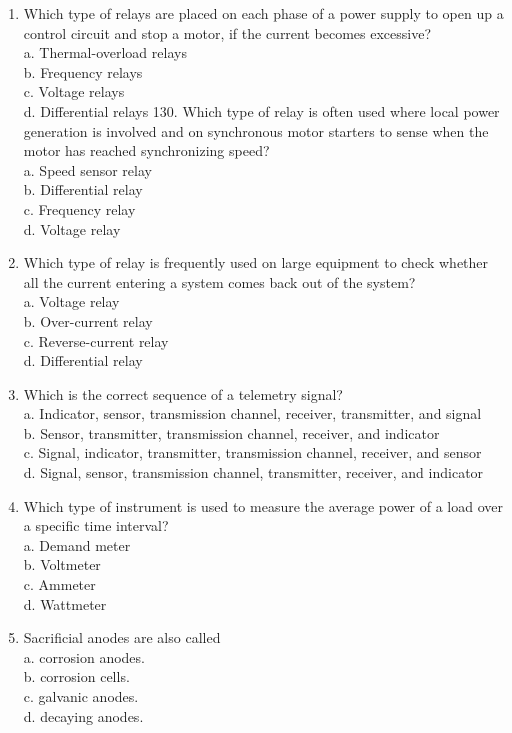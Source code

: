 \documentclass[10pt]{article}
\begin{document}
\begin{enumerate}
  \item Which type of relays are placed on each phase of a power supply to open up a control circuit and stop a motor, if the current becomes excessive?\\
a. Thermal-overload relays\\
b. Frequency relays\\
c. Voltage relays\\
d. Differential relays 130. Which type of relay is often used where local power generation is involved and on synchronous motor starters to sense when the motor has reached synchronizing speed?\\
a. Speed sensor relay\\
b. Differential relay\\
c. Frequency relay\\
d. Voltage relay

  \item Which type of relay is frequently used on large equipment to check whether all the current entering a system comes back out of the system?\\
a. Voltage relay\\
b. Over-current relay\\
c. Reverse-current relay\\
d. Differential relay

  \item Which is the correct sequence of a telemetry signal?\\
a. Indicator, sensor, transmission channel, receiver, transmitter, and signal\\
b. Sensor, transmitter, transmission channel, receiver, and indicator\\
c. Signal, indicator, transmitter, transmission channel, receiver, and sensor\\
d. Signal, sensor, transmission channel, transmitter, receiver, and indicator

  \item Which type of instrument is used to measure the average power of a load over a specific time interval?\\
a. Demand meter\\
b. Voltmeter\\
c. Ammeter\\
d. Wattmeter

  \item Sacrificial anodes are also called\\
a. corrosion anodes.\\
b. corrosion cells.\\
c. galvanic anodes.\\
d. decaying anodes.


\end{enumerate}
\end{document}
